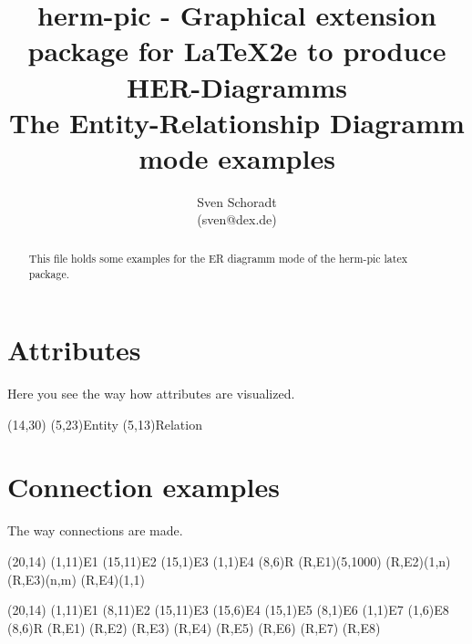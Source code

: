 \documentclass[a4paper,11pt]{article}
\author{Sven Schoradt \\ (sven@dex.de)}
\title{herm-pic - Graphical extension package for LaTeX2e to produce 
       HER-Diagramms\\The Entity-Relationship Diagramm mode examples}
\begin{document}
\maketitle

\begin{abstract} 
This file holds some examples for the ER diagramm mode of the herm-pic latex package.
\end{abstract}

\section{Attributes}

Here you see the way how attributes are visualized.

\begin{schema}(14,30)
  \entity[entity](5,23){Entity}
  \relation[relation](5,13){Relation}
\end{schema}

\section{Connection examples}

The way connections are made.

\begin{schema}(20,14)
  \entity(1,11){E1}
  \entity(15,11){E2}
  \entity(15,1){E3}
  \entity(1,1){E4}
  \relation(8,6){R}
  \connection(R,E1){(5,1000)}
  \connection(R,E2){(1,n)}
  \connection(R,E3){(n,m)}
  \connection(R,E4){(1,1)}
\end{schema}

\begin{schema}(20,14)
  \entity(1,11){E1}
  \entity(8,11){E2}
  \entity(15,11){E3}
  \entity(15,6){E4}
  \entity(15,1){E5}
  \entity(8,1){E6}
  \entity(1,1){E7}
  \entity(1,6){E8}
  \relation(8,6){R}
  \connection(R,E1){}
  \connection(R,E2){}
  \connection(R,E3){}
  \connection(R,E4){}
  \connection(R,E5){}
  \connection(R,E6){}
  \connection(R,E7){}
  \connection(R,E8){}
\end{schema}
\end{document}
